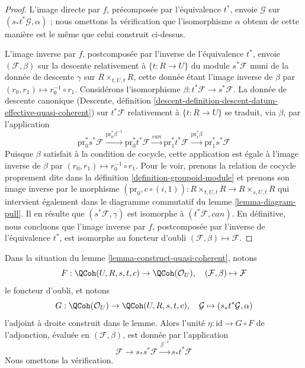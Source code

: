 \begin{proof}
\medskip\noindent
L'image directe par $f$, précomposée par l'équivalence $t^*$, envoie
$\mathcal{G}$ sur $(s_*t^*\mathcal{G}, \alpha)$ ;
nous omettons la vérification que l'isomorphisme $\alpha$
obtenu de cette manière est le même que celui construit ci-dessus.

\medskip\noindent
L'image inverse par $f$, postcomposée par l'inverse de l'équivalence $t^*$,
envoie $(\mathcal{F}, \beta)$ sur la descente relativement à $\{t : R \to U\}$
du module $s^*\mathcal{F}$ muni de la donnée de descente $\gamma$ sur
$R \times_{t, U, t} R$, cette donnée étant l'image inverse de $\beta$ par
$(r_0, r_1) \mapsto r_0^{-1} \circ r_1$.
Considérons l'isomorphisme $\beta : t^*\mathcal{F} \to s^*\mathcal{F}$.
La donnée de descente canonique (Descente, définition
\ref{descent-definition-descent-datum-effective-quasi-coherent})
sur $t^*\mathcal{F}$ relativement à $\{t : R \to U\}$
se traduit, via $\beta$, par l'application
$$
\text{pr}_0^*s^*\mathcal{F}
\xrightarrow{\text{pr}_0^*\beta^{-1}}
\text{pr}_0^*t^*\mathcal{F}
\xrightarrow{can}
\text{pr}_1^*t^*\mathcal{F}
\xrightarrow{\text{pr}_1^*\beta}
\text{pr}_1^*s^*\mathcal{F}
$$
Puisque $\beta$ satisfait à la condition de cocycle, cette application est égale à l'image inverse
de $\beta$ par $(r_0, r_1) \mapsto r_0^{-1} \circ r_1$. Pour le voir,
prenons la relation de cocycle proprement dite dans la définition \ref{definition-groupoid-module}
et prenons son image inverse par le morphisme
$(\text{pr}_0, c \circ (i, 1)) : R \times_{t, U, t} R \to R \times_{s, U, t} R$
qui intervient également dans le diagramme commutatif du
lemme \ref{lemma-diagram-pull}. Il en résulte que
$(s^*\mathcal{F}, \gamma)$ est isomorphe à $(t^*\mathcal{F}, can)$.
En définitive, nous concluons que l'image inverse par $f$, postcomposée par
l'inverse de l'équivalence $t^*$, est isomorphe au foncteur d'oubli
$(\mathcal{F}, \beta) \mapsto \mathcal{F}$.
\end{proof}

\begin{remark}
\label{remark-adjunction-map}
Dans la situation du lemme \ref{lemma-construct-quasi-coherent}, notons
$$
F : \QCoh(U, R, s, t, c) \to \QCoh(\mathcal{O}_U),\quad
(\mathcal{F}, \beta) \mapsto \mathcal{F}
$$
le foncteur d'oubli, et notons
$$
G : \QCoh(\mathcal{O}_U) \to \QCoh(U, R, s, t, c),\quad
\mathcal{G} \mapsto (s_*t^*\mathcal{G}, \alpha)
$$
l'adjoint à droite construit dans le lemme. Alors l'unité
$\eta : \text{id} \to G \circ F$ de l'adjonction, évaluée
en $(\mathcal{F}, \beta)$, est donnée par l'application
$$
\mathcal{F} \to s_*s^*\mathcal{F} \xrightarrow{\beta^{-1}} s_*t^*\mathcal{F}
$$
Nous omettons la vérification.
\end{remark}

